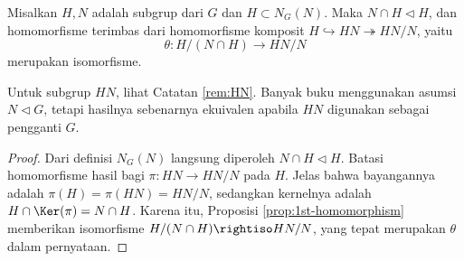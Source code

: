 \begin{proposition}\label{prop:3rd-homomorphism}
	Misalkan $H, N$ adalah subgrup dari $G$ dan $H \subset N_G(N)$. Maka $N \cap H \lhd H$, dan homomorfisme terimbas dari homomorfisme komposit $H \hookrightarrow HN \twoheadrightarrow HN/N$, yaitu
	\[ \theta: H/(N \cap H) \to HN/N \]
	merupakan isomorfisme.
\end{proposition}
Untuk subgrup $HN$, lihat Catatan \ref{rem:HN}. Banyak buku menggunakan asumsi $N \lhd G$, tetapi hasilnya sebenarnya ekuivalen apabila $HN$ digunakan sebagai pengganti $G$.
\begin{proof}
	Dari definisi $N_G(N)$ langsung diperoleh $N \cap H \lhd H$. Batasi homomorfisme hasil bagi $\pi: HN \to HN/N$ pada $H$. Jelas bahwa bayangannya adalah $\pi(H) = \pi(HN) = HN/N$, sedangkan kernelnya adalah $H \cap \Ker(\pi) = N \cap H$. Karena itu, Proposisi \ref{prop:1st-homomorphism} memberikan isomorfisme $H/(N \cap H) \rightiso HN/N$, yang tepat merupakan $\theta$ dalam pernyataan.
\end{proof}

